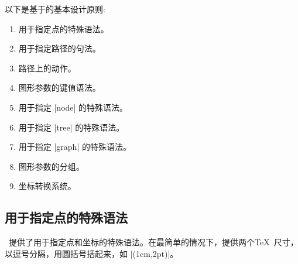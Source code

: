 以下是基于\tikzname 的基本设计原则:
%
\begin{enumerate}
    \item 用于指定点的特殊语法。
    \item 用于指定路径的句法。
    \item 路径上的动作。
    \item 图形参数的键值语法。
    \item 用于指定 |node| 的特殊语法。
    \item 用于指定 |tree| 的特殊语法。
    \item 用于指定 |graph| 的特殊语法。
    \item 图形参数的分组。
    \item 坐标转换系统。
\end{enumerate}


\subsection{用于指定点的特殊语法}


\tikzname\ 提供了用于指定点和坐标的特殊语法。在最简单的情况下，提供两个\TeX\ 尺寸，以逗号分隔，用圆括号括起来，如 |(1cm,2pt)|。


